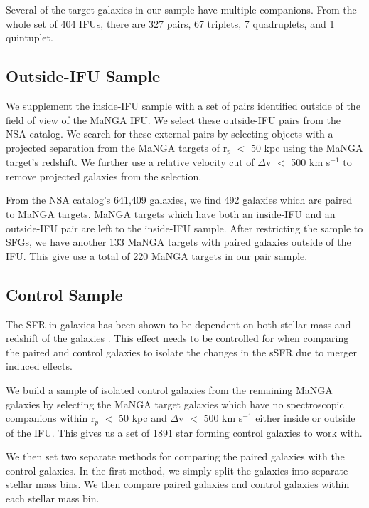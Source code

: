 \documentclass[iop,revtex4,twocolumn,apj,numberedappendix,appendixfloats]{emulateapj}
\begin{document}
Several of the target galaxies in our sample have multiple companions. From the whole set of 404 IFUs, there are 327 pairs, 67 triplets, 7 quadruplets, and 1 quintuplet. 

\subsection{Outside-IFU Sample}\label{sec:outside}

We supplement the inside-IFU sample with a set of pairs identified outside of the field of view of the MaNGA IFU. We select these outside-IFU pairs from the NSA catalog. We search for these external pairs by selecting objects with a projected separation from the MaNGA targets of r$_p$ $<$ 50 kpc using the MaNGA target's redshift. We further use a relative velocity cut of $\Delta$v $<$ 500 km s$^{-1}$ to remove projected galaxies from the selection. 

From the NSA catalog's 641,409 galaxies, we find 492 galaxies which are paired to MaNGA targets. MaNGA targets which have both an inside-IFU and an outside-IFU pair are left to the inside-IFU sample. After restricting the sample to SFGs, we have another 133 MaNGA targets with paired galaxies outside of the IFU. This give use a total of 220 MaNGA targets in our pair sample.

\subsection{Control Sample}\label{sec:control}

The SFR in galaxies has been shown to be dependent on both stellar mass and redshift of the galaxies \citep{Noeske:2007}. This effect needs to be controlled for when comparing the paired and control galaxies to isolate the changes in the sSFR due to merger induced effects. 

We build a sample of isolated control galaxies from the remaining MaNGA galaxies by selecting the MaNGA target galaxies which have no spectroscopic companions within r$_p$ $<$ 50 kpc and $\Delta$v $<$ 500 km s$^{-1}$ either inside or outside of the IFU. This gives us a set of 1891 star forming control galaxies to work with.

We then set two separate methods for comparing the paired galaxies with the control galaxies. In the first method, we simply split the galaxies into separate stellar mass bins. We then compare paired galaxies and control galaxies within each stellar mass bin. 
\end{document}
